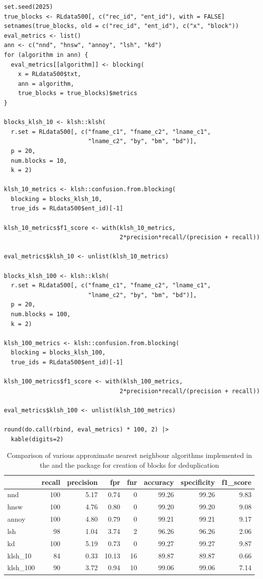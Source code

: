 \begin{verbatim}
set.seed(2025)
true_blocks <- RLdata500[, c("rec_id", "ent_id"), with = FALSE]
setnames(true_blocks, old = c("rec_id", "ent_id"), c("x", "block"))
eval_metrics <- list()
ann <- c("nnd", "hnsw", "annoy", "lsh", "kd")
for (algorithm in ann) {
  eval_metrics[[algorithm]] <- blocking(
    x = RLdata500$txt,
    ann = algorithm,
    true_blocks = true_blocks)$metrics
}

blocks_klsh_10 <- klsh::klsh(
  r.set = RLdata500[, c("fname_c1", "fname_c2", "lname_c1",
                        "lname_c2", "by", "bm", "bd")],
  p = 20,
  num.blocks = 10,
  k = 2)

klsh_10_metrics <- klsh::confusion.from.blocking(
  blocking = blocks_klsh_10, 
  true_ids = RLdata500$ent_id)[-1]

klsh_10_metrics$f1_score <- with(klsh_10_metrics, 
                                 2*precision*recall/(precision + recall))

eval_metrics$klsh_10 <- unlist(klsh_10_metrics)

blocks_klsh_100 <- klsh::klsh(
  r.set = RLdata500[, c("fname_c1", "fname_c2", "lname_c1",
                        "lname_c2", "by", "bm", "bd")],
  p = 20,
  num.blocks = 100,
  k = 2)

klsh_100_metrics <- klsh::confusion.from.blocking(
  blocking = blocks_klsh_100, 
  true_ids = RLdata500$ent_id)[-1]

klsh_100_metrics$f1_score <- with(klsh_100_metrics, 
                                 2*precision*recall/(precision + recall))

eval_metrics$klsh_100 <- unlist(klsh_100_metrics)

round(do.call(rbind, eval_metrics) * 100, 2) |>
  kable(digits=2) 
\end{verbatim}

\begin{table}

\caption{\label{tab:comparision}Comparison of various approximate nearest neighbour algorithms implemented in the  and the  package for creation of blocks for deduplication}
\centering
\begin{tabular}[t]{l|r|r|r|r|r|r|r}
\hline
  & recall & precision & fpr & fnr & accuracy & specificity & f1\_score\\
\hline
nnd & 100 & 5.17 & 0.74 & 0 & 99.26 & 99.26 & 9.83\\
\hline
hnsw & 100 & 4.76 & 0.80 & 0 & 99.20 & 99.20 & 9.08\\
\hline
annoy & 100 & 4.80 & 0.79 & 0 & 99.21 & 99.21 & 9.17\\
\hline
lsh & 98 & 1.04 & 3.74 & 2 & 96.26 & 96.26 & 2.06\\
\hline
kd & 100 & 5.19 & 0.73 & 0 & 99.27 & 99.27 & 9.87\\
\hline
klsh\_10 & 84 & 0.33 & 10.13 & 16 & 89.87 & 89.87 & 0.66\\
\hline
klsh\_100 & 90 & 3.72 & 0.94 & 10 & 99.06 & 99.06 & 7.14\\
\hline
\end{tabular}
\end{table}

